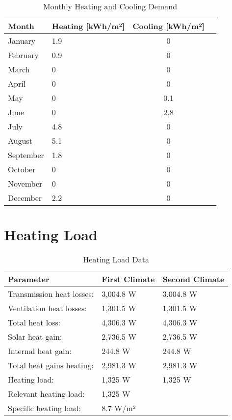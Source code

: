 \documentclass{article}
\begin{document}
\begin{table}[h]
    \centering
    \caption{Monthly Heating and Cooling Demand}
    \begin{tabular}{@{}llcc@{}}
        \toprule
        Month      & Heating [kWh/m²] & Cooling [kWh/m²] \\
        \midrule
        January    & 1.9              & 0                \\
        February   & 0.9              & 0                \\
        March      & 0                & 0                \\
        April      & 0                & 0                \\
        May        & 0                & 0.1              \\
        June       & 0                & 2.8              \\
        July       & 4.8              & 0                \\
        August     & 5.1              & 0                \\
        September   & 1.8              & 0                \\
        October    & 0                & 0                \\
        November   & 0                & 0                \\
        December   & 2.2              & 0                \\
        \bottomrule
    \end{tabular}
    \label{tab:heating_cooling}
\end{table}


\section*{Heating Load}

\begin{table}[h!]
    \centering
    \caption{Heating Load Data}
    \begin{tabular}{@{}lll@{}}
        \toprule
        \textbf{Parameter} & \textbf{First Climate} & \textbf{Second Climate} \\ \midrule
        Transmission heat losses: & 3,004.8 W & 3,004.8 W \\
        Ventilation heat losses: & 1,301.5 W & 1,301.5 W \\
        Total heat loss: & 4,306.3 W & 4,306.3 W \\
        Solar heat gain: & 2,736.5 W & 2,736.5 W \\
        Internal heat gain: & 244.8 W & 244.8 W \\
        Total heat gains heating: & 2,981.3 W & 2,981.3 W \\ \midrule
        Heating load: & 1,325 W & 1,325 W \\ \midrule
        Relevant heating load: & 1,325 W &  \\
        Specific heating load: & 8.7 W/m² &  \\
        \bottomrule
    \end{tabular}
\end{table}
\end{document}
